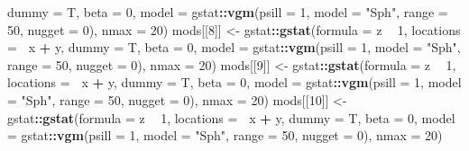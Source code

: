 \documentclass[
]{article}
\newenvironment{Shaded}{\begin{snugshade}}{\end{snugshade}}
\newcommand{\DataTypeTok}[1]{\textcolor[rgb]{0.13,0.29,0.53}{#1}}
\newcommand{\DecValTok}[1]{\textcolor[rgb]{0.00,0.00,0.81}{#1}}
\newcommand{\KeywordTok}[1]{\textcolor[rgb]{0.13,0.29,0.53}{\textbf{#1}}}
\newcommand{\NormalTok}[1]{#1}
\newcommand{\OperatorTok}[1]{\textcolor[rgb]{0.81,0.36,0.00}{\textbf{#1}}}
\newcommand{\StringTok}[1]{\textcolor[rgb]{0.31,0.60,0.02}{#1}}
\begin{document}
\begin{Shaded}
\begin{Highlighting}[]
    \DataTypeTok{dummy =}\NormalTok{ T, }\DataTypeTok{beta =} \DecValTok{0}\NormalTok{, }\DataTypeTok{model =}\NormalTok{ gstat}\OperatorTok{::}\KeywordTok{vgm}\NormalTok{(}\DataTypeTok{psill =} \DecValTok{1}\NormalTok{, }\DataTypeTok{model =} \StringTok{"Sph"}\NormalTok{, }
        \DataTypeTok{range =} \DecValTok{50}\NormalTok{, }\DataTypeTok{nugget =} \DecValTok{0}\NormalTok{), }\DataTypeTok{nmax =} \DecValTok{20}\NormalTok{)}
\NormalTok{mods[[}\DecValTok{8}\NormalTok{]] <-}\StringTok{ }\NormalTok{gstat}\OperatorTok{::}\KeywordTok{gstat}\NormalTok{(}\DataTypeTok{formula =}\NormalTok{ z }\OperatorTok{~}\StringTok{ }\DecValTok{1}\NormalTok{, }\DataTypeTok{locations =} \OperatorTok{~}\NormalTok{x }\OperatorTok{+}\StringTok{ }\NormalTok{y, }
    \DataTypeTok{dummy =}\NormalTok{ T, }\DataTypeTok{beta =} \DecValTok{0}\NormalTok{, }\DataTypeTok{model =}\NormalTok{ gstat}\OperatorTok{::}\KeywordTok{vgm}\NormalTok{(}\DataTypeTok{psill =} \DecValTok{1}\NormalTok{, }\DataTypeTok{model =} \StringTok{"Sph"}\NormalTok{, }
        \DataTypeTok{range =} \DecValTok{50}\NormalTok{, }\DataTypeTok{nugget =} \DecValTok{0}\NormalTok{), }\DataTypeTok{nmax =} \DecValTok{20}\NormalTok{)}
\NormalTok{mods[[}\DecValTok{9}\NormalTok{]] <-}\StringTok{ }\NormalTok{gstat}\OperatorTok{::}\KeywordTok{gstat}\NormalTok{(}\DataTypeTok{formula =}\NormalTok{ z }\OperatorTok{~}\StringTok{ }\DecValTok{1}\NormalTok{, }\DataTypeTok{locations =} \OperatorTok{~}\NormalTok{x }\OperatorTok{+}\StringTok{ }\NormalTok{y, }
    \DataTypeTok{dummy =}\NormalTok{ T, }\DataTypeTok{beta =} \DecValTok{0}\NormalTok{, }\DataTypeTok{model =}\NormalTok{ gstat}\OperatorTok{::}\KeywordTok{vgm}\NormalTok{(}\DataTypeTok{psill =} \DecValTok{1}\NormalTok{, }\DataTypeTok{model =} \StringTok{"Sph"}\NormalTok{, }
        \DataTypeTok{range =} \DecValTok{50}\NormalTok{, }\DataTypeTok{nugget =} \DecValTok{0}\NormalTok{), }\DataTypeTok{nmax =} \DecValTok{20}\NormalTok{)}
\NormalTok{mods[[}\DecValTok{10}\NormalTok{]] <-}\StringTok{ }\NormalTok{gstat}\OperatorTok{::}\KeywordTok{gstat}\NormalTok{(}\DataTypeTok{formula =}\NormalTok{ z }\OperatorTok{~}\StringTok{ }\DecValTok{1}\NormalTok{, }\DataTypeTok{locations =} \OperatorTok{~}\NormalTok{x }\OperatorTok{+}\StringTok{ }
\StringTok{    }\NormalTok{y, }\DataTypeTok{dummy =}\NormalTok{ T, }\DataTypeTok{beta =} \DecValTok{0}\NormalTok{, }\DataTypeTok{model =}\NormalTok{ gstat}\OperatorTok{::}\KeywordTok{vgm}\NormalTok{(}\DataTypeTok{psill =} \DecValTok{1}\NormalTok{, }\DataTypeTok{model =} \StringTok{"Sph"}\NormalTok{, }
    \DataTypeTok{range =} \DecValTok{50}\NormalTok{, }\DataTypeTok{nugget =} \DecValTok{0}\NormalTok{), }\DataTypeTok{nmax =} \DecValTok{20}\NormalTok{)}
\end{Highlighting}
\end{Shaded}
\end{document}
